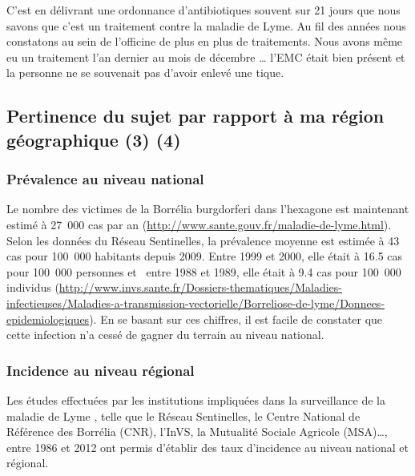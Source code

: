 \documentclass[12pt,a4wide]{article}
\begin{document}
C'est en délivrant une ordonnance d'antibiotiques souvent sur 21 jours que nous
savons que c'est un traitement contre la maladie de Lyme. Au fil des années nous
constatons au sein de l'officine de plus en plus de traitements. Nous avons même
eu un traitement l'an dernier au mois de décembre \ldots{} l'EMC était bien présent
et la personne ne se souvenait pas d'avoir enlevé une tique.






\subsection{Pertinence du sujet par rapport à ma région géographique (3) (4)}
\label{sec-3-6}


\subsubsection{Prévalence au niveau national}
\label{sec-3-6-1}

Le nombre des victimes de la Borrélia burgdorferi dans l'hexagone est maintenant estimé à 27 000 cas par an (\url{http://www.sante.gouv.fr/maladie-de-lyme.html}). Selon les données du Réseau Sentinelles, la prévalence moyenne est estimée à 43 cas pour 100 000 habitants depuis 2009. Entre 1999 et 2000, elle était à 16.5 cas pour 100 000 personnes et  entre 1988 et 1989, elle était à 9.4 cas pour 100 000 individus (\url{http://www.invs.sante.fr/Dossiers-thematiques/Maladies-infectieuses/Maladies-a-transmission-vectorielle/Borreliose-de-lyme/Donnees-epidemiologiques}). En se basant sur ces chiffres, il est facile de constater que  cette infection n'a cessé de gagner du terrain au niveau national.

\subsubsection{Incidence au niveau régional}
\label{sec-3-6-2}



Les études effectuées par les institutions impliquées dans la surveillance de la
maladie  de Lyme  ,  telle que  le  Réseau Sentinelles,  le  Centre National  de
Référence  des Borrélia  (CNR), l'InVS,  la Mutualité  Sociale Agricole  (MSA)…,
entre 1986 et 2012 ont permis  d'établir des taux d'incidence au niveau national
et régional.
\end{document}
